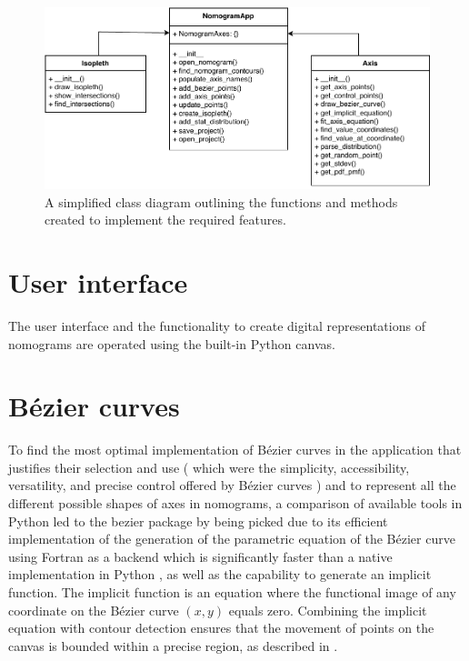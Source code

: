 \documentclass{l4proj}
\begin{document}
\begin{figure}[H]
    \centering
    \includegraphics[width=\linewidth]{dissertation//images//myFigures//implementation/ClassDiagram.drawio.pdf}
    \caption{A simplified class diagram outlining the functions and methods created to implement the required features.}
    \label{fig:ClassDiagram}
\end{figure}

\section{User interface}

The user interface and the functionality to create digital representations of nomograms are operated using the built-in Python canvas. 

\section{Bézier curves} 

To find the most optimal implementation of Bézier curves in the application that justifies their selection and use ( which were the simplicity, accessibility, versatility, and precise control offered by Bézier curves ) and to represent all the different possible shapes of axes in nomograms, a comparison of available tools in Python led to the bezier package by \cite{hermes_bezier_2023} being picked due to its efficient implementation of the generation of the parametric equation of the Bézier curve using Fortran as a backend which is significantly faster than a native implementation in Python \citep{zwinkau_faster_nodate}, as well as the capability to generate an implicit function. The implicit function is an equation where the functional image of any coordinate on the Bézier curve \((x,y)\) equals zero. Combining the implicit equation with contour detection ensures that the movement of points on the canvas is bounded within a precise region, as described in . 
\end{document}
